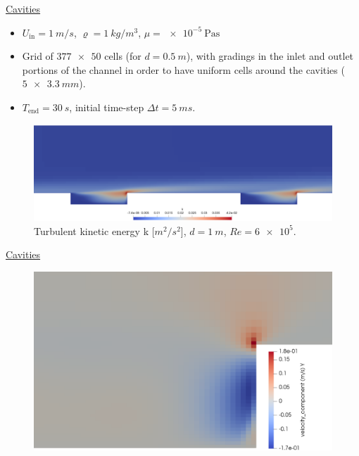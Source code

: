 \documentclass{beamer}
\begin{document}
\begin{frame}[label=cavitiesSupp]{\hyperlink{cavities}{Cavities}}
\begin{itemize}
	\item $U_\text{in} = \SI{1}{m/s}$, $\varrho=\SI{1}{kg/m^3}$, 
	$\mu=\SI{e-5}{\pascal\second}$
	\item Grid of $\num{377x50}$ cells (for $d=\SI{0.5}{m}$), with gradings in 
	the inlet and outlet portions of the channel in order to have uniform cells 
	around the cavities ($\SI{5x3.3}{mm}$).
	\item $T_\text{end}=\SI{30}{s}$, initial time-step $\Delta t = \SI{5}{ms}$.
\end{itemize}
\begin{figure}
	\centering
	\includegraphics[width=\textwidth]{cavities_dist1_k.png}
	\caption{\tiny Turbulent kinetic energy k [$\si{m^2/s^2}$], $d=\SI{1}{m}$, 
	$Re=\num{6e5}$.}
\end{figure}
\end{frame}
\begin{frame}{\hyperlink{cavities}{Cavities}}
\begin{figure}
	\centering
	\includegraphics[height=0.8\textheight]{cavities_vel_split.png}
\end{figure}
\end{frame}
\end{document}
